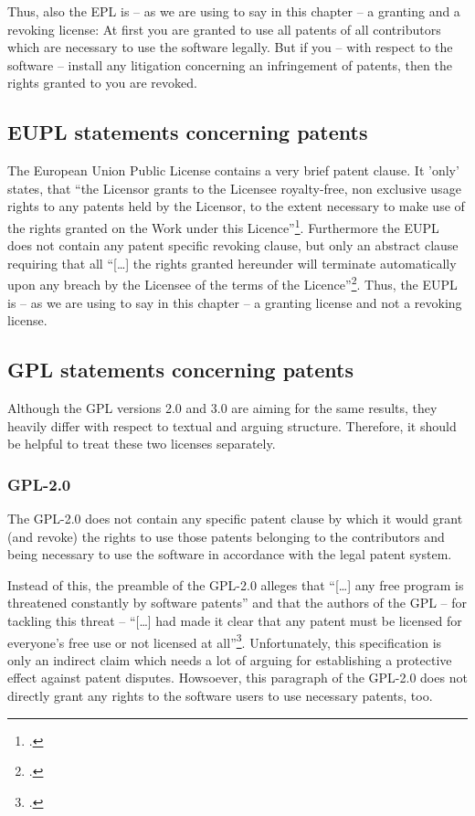 Thus, also the EPL is -- as we are using to say in this chapter -- a granting and
a revoking license: At first you are granted to use all patents of all
contributors which are necessary to use the software legally. But if you -- with
respect to the software -- install any litigation concerning an infringement of
patents, then the rights granted to you are revoked.

\subsection{EUPL statements concerning patents}\label{subsec:EupLPatentClause}
The European Union Public License contains a very brief patent clause. It 'only'
states, that \enquote{the Licensor grants to the Licensee royalty-free, non
exclusive usage rights to any patents held by the Licensor, to the extent
necessary to make use of the rights granted on the Work under this
Licence}\footcite[cf.][\nopage wp.\ §2 at its tail]{EuplLicense2007en}.
Furthermore the EUPL does not contain any patent specific revoking clause, but
only an abstract clause requiring that all \enquote{[\ldots] the rights granted
hereunder will terminate automatically upon any breach by the Licensee of the
terms of the Licence}\footcite[cf.][\nopage wp.\ §12]{EuplLicense2007en}. Thus,
the EUPL is -- as we are using to say in this chapter -- a granting license and
not a revoking license.

\subsection{GPL statements concerning patents}

Although the GPL versions 2.0 and 3.0 are aiming for the same results, they
heavily differ with respect to textual and arguing structure. Therefore, it
should be helpful to treat these two licenses separately.

\subsubsection {GPL-2.0} \label{subsec:Gpl20PatentClause}

The GPL-2.0 does not contain any specific patent clause by which it would grant
(and revoke) the rights to use those patents belonging to the contributors and 
being necessary to use the software in accordance with the legal patent system.

Instead of this, the preamble of the GPL-2.0 alleges that \enquote{[\ldots] any
free program is threatened constantly by software patents} and that the authors
of the GPL -- for tackling this threat -- \enquote{[\ldots] had made it clear
that any patent must be licensed for everyone's free use or not licensed at
all}\footcite[cf.][\nopage wp, Preamble]{Gpl20OsiLicense1991a}. Unfortunately,
this specification is only an indirect claim which needs a lot of arguing for
establishing a protective effect against patent disputes. Howsoever, this
paragraph of the GPL-2.0 does not directly grant any rights to the software
users to use necessary patents, too.

